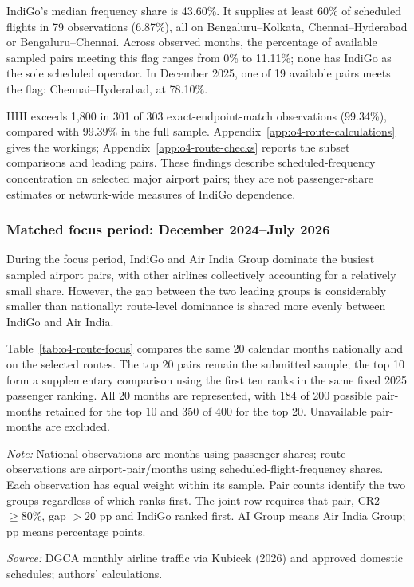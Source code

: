 \documentclass[12pt,a4paper]{article}
\begin{document}
IndiGo's median frequency share is 43.60\%. It supplies at least 60\% of scheduled flights in 79 observations (6.87\%), all on Bengaluru--Kolkata, Chennai--Hyderabad or Bengaluru--Chennai. Across observed months, the percentage of available sampled pairs meeting this flag ranges from 0\% to 11.11\%; none has IndiGo as the sole scheduled operator. In December 2025, one of 19 available pairs meets the flag: Chennai--Hyderabad, at 78.10\%.

HHI exceeds 1,800 in 301 of 303 exact-endpoint-match observations (99.34\%), compared with 99.39\% in the full sample. Appendix~\ref{app:o4-route-calculations} gives the workings; Appendix~\ref{app:o4-route-checks} reports the subset comparisons and leading pairs. These findings describe scheduled-frequency concentration on selected major airport pairs; they are not passenger-share estimates or network-wide measures of IndiGo dependence.

\clearpage
\subsubsection*{Matched focus period: December 2024--July 2026}
During the focus period, IndiGo and Air India Group dominate the busiest sampled airport pairs, with other airlines collectively accounting for a relatively small share. However, the gap between the two leading groups is considerably smaller than nationally: route-level dominance is shared more evenly between IndiGo and Air India.

Table~\ref{tab:o4-route-focus} compares the same 20 calendar months nationally and on the selected routes. The top 20 pairs remain the submitted sample; the top 10 form a supplementary comparison using the first ten ranks in the same fixed 2025 passenger ranking. All 20 months are represented, with 184 of 200 possible pair-months retained for the top 10 and 350 of 400 for the top 20. Unavailable pair-months are excluded.

\begin{minipage}{\linewidth}
\captionsetup{font=small,labelfont=bf,justification=raggedright,singlelinecheck=false,hypcap=false}
\label{tab:o4-route-focus}
\centering
{\small{}\setlength{\tabcolsep}{4pt}\par}
\vspace{4pt}
{\footnotesize{}\raggedright\textit{Note:} National observations are months using passenger shares; route observations are airport-pair/months using scheduled-flight-frequency shares. Each observation has equal weight within its sample. Pair counts identify the two groups regardless of which ranks first. The joint row requires that pair, CR2 $\geq80\%$, gap $>20$ pp and IndiGo ranked first. AI Group means Air India Group; pp means percentage points.\par
\textit{Source:} DGCA monthly airline traffic via Kubicek (2026) and approved domestic schedules; authors' calculations.\par}
\end{minipage}
\end{document}
